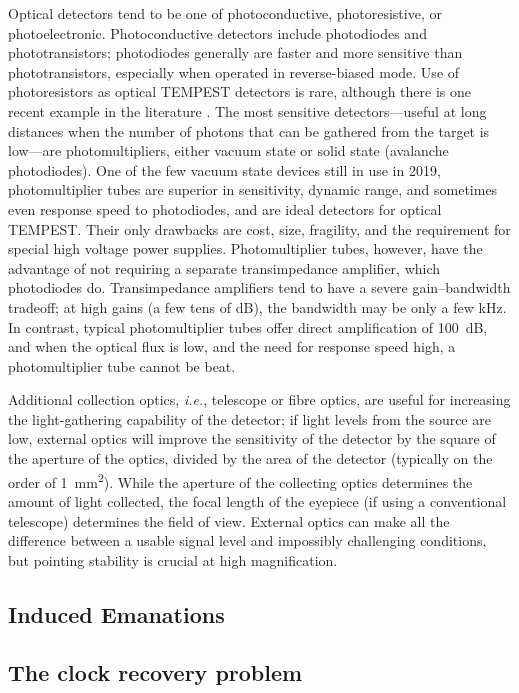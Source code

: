 \documentclass[a4paper,twoside,11pt]{book}
\begin{document}
Optical detectors tend to be one of photoconductive, photoresistive, or
photoelectronic. Photoconductive detectors include photodiodes and
phototransistors; photodiodes generally are faster and more sensitive than
phototransistors, especially when operated in reverse-biased mode. Use of
photoresistors as optical TEMPEST detectors is rare, although there is one
recent example in the literature \cite{Barisani2009a}. The most sensitive
detectors---useful at long distances when the number of photons that can be
gathered from the target is low---are photomultipliers, either vacuum state or
solid state (avalanche photodiodes). One of the few vacuum state devices still
in use in 2019, photomultiplier tubes are superior in sensitivity, dynamic
range, and sometimes even response speed to photodiodes, and are ideal
detectors for optical TEMPEST. Their only drawbacks are cost, size, fragility,
and the requirement for special high voltage power supplies. Photomultiplier
tubes, however, have the advantage of not requiring a separate transimpedance
amplifier, which photodiodes do. Transimpedance amplifiers tend to have a severe
gain--bandwidth tradeoff; at high gains (a few tens of \si{\deci\bel}), the
bandwidth may be only a few \si{\kilo\hertz}. In contrast, typical
photomultiplier tubes offer direct amplification of \SI{100}{\deci\bel}, and
when the optical flux is low, and the need for response speed high, a
photomultiplier tube cannot be beat.

Additional collection optics, {\it i.e.}, telescope or fibre optics, are useful
for increasing the light-gathering capability of the detector; if light levels
from the source are low, external optics will improve the sensitivity of the
detector by the square of the aperture of the optics, divided by the area of
the detector (typically on the order of \SI{1}{\square\milli\metre}). While the
aperture of the collecting optics determines the amount of light collected, the
focal length of the eyepiece (if using a conventional telescope) determines the
field of view. External optics can make all the difference between a usable
signal level and impossibly challenging conditions, but pointing stability is
crucial at high magnification.

\subsection{Induced Emanations}

\label{section:injection_attacks}

\subsection{The clock recovery problem}
\end{document}
